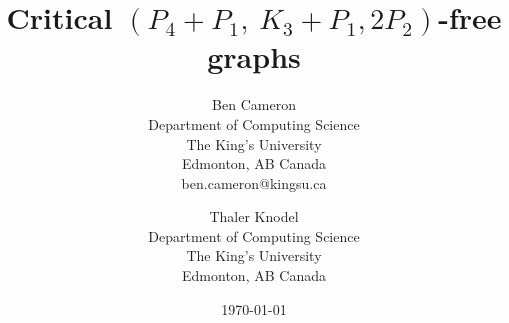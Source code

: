\documentclass[11pt]{article}
\theoremstyle{definition}
\newcommand{\forbid}{$(P_4+P_1,\ K_3+P_1,2P_2)$}
\begin{document}
\title{Critical \forbid -free graphs}
\author{
Ben Cameron\\ %
\small Department of Computing Science\\
\small The King's University\\
\small Edmonton, AB Canada\\
\small ben.cameron@kingsu.ca\\
\and
Thaler Knodel\\ %
\small Department of Computing Science\\
\small The King's University\\
\small Edmonton, AB Canada\\
}

\date{\today}

\maketitle


\begin{abstract}
\end{abstract}
\end{document}
